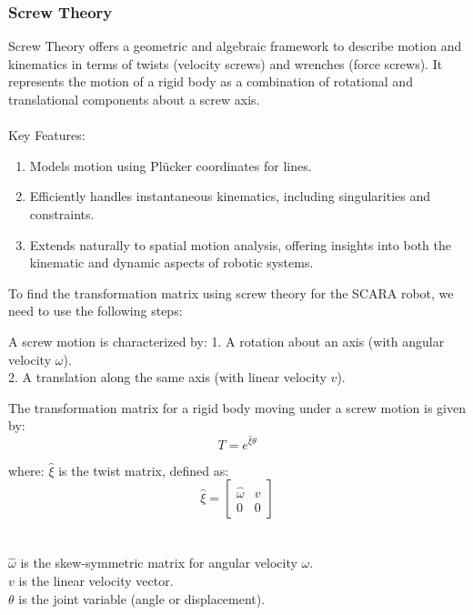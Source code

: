 \documentclass[12pt]{report}
\begin{document}
\subsubsection{Screw Theory}

Screw Theory offers a geometric and algebraic framework to describe motion and kinematics in terms of twists (velocity screws) and wrenches (force screws). It represents the motion of a rigid body as a combination of rotational and translational components about a screw axis.\\\\
Key Features:
\begin{enumerate}[label=\roman*.]
	\item Models motion using Plücker coordinates for lines.
	\item Efficiently handles instantaneous kinematics, including singularities and constraints.
	\item Extends naturally to spatial motion analysis, offering insights into both the kinematic and dynamic aspects of robotic systems.
\end{enumerate}
To find the transformation matrix using screw theory for the SCARA robot, we need to use the following steps:

A screw motion is characterized by:
1. A rotation about an axis (with angular velocity \(\omega\)).
\\2. A translation along the same axis (with linear velocity \(v\)).

The transformation matrix for a rigid body moving under a screw motion is given by:
\begin{equation}
	T = e^{\hat{\xi} \theta}
\end{equation}

where:
\(\hat{\xi}\) is the twist matrix, defined as:
\begin{equation}
	\hat{\xi} =
	\begin{bmatrix}
		\hat{\omega} & v \\
		0 & 0
	\end{bmatrix}
\end{equation}\\\\\(\hat{\omega}\) is the skew-symmetric matrix for angular velocity \(\omega\).
\\ \(v\) is the linear velocity vector.
\\ \(\theta\) is the joint variable (angle or displacement).
\end{document}
